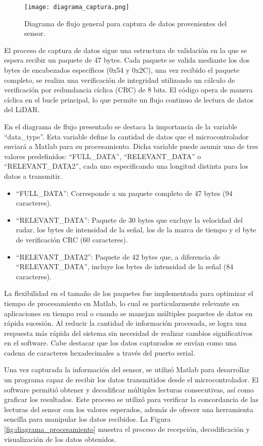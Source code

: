 \begin{figure}[H]
	\centering
	\texttt{[image: diagrama\_captura.png]}
	\caption{Diagrama de flujo general para captura de datos provenientes del sensor.}
	\label{fig:diagrama_captura}
\end{figure}

El proceso de captura de datos sigue una estructura de validación en la que se espera recibir un paquete de 47 bytes. Cada paquete se valida mediante los dos bytes de encabezados específicos (0x54 y 0x2C), una vez recibido el paquete completo, se realiza una verificación de integridad utilizando un cálculo de verificación por redundancia cíclica (CRC) de 8 bits. El código opera de manera cíclica en el bucle principal, lo que permite un flujo continuo de lectura de datos del LiDAR. 

En el diagrama de flujo presentado se destaca la importancia de la variable ``data\_type''. Esta variable define la cantidad de datos que el microcontrolador enviará a Matlab para su procesamiento. Dicha variable puede asumir uno de tres valores predefinidos: ``FULL\_DATA'', ``RELEVANT\_DATA'' o ``RELEVANT\_DATA2'', cada uno especificando una longitud distinta para los datos a transmitir.
\begin{itemize}
	\item  ``FULL\_DATA'': Corresponde a un paquete completo de 47 bytes (94 caracteres).
	\item ``RELEVANT\_DATA'': Paquete de 30 bytes que excluye la velocidad del radar, los bytes de intensidad de la señal, los de la marca de tiempo y el byte de verificación CRC (60 caracteres).
	\item ``RELEVANT\_DATA2'': Paquete de 42 bytes que, a diferencia de ``RELEVANT\_DATA'', incluye los bytes de intensidad de la señal (84 caracteres).
\end{itemize}
La flexibilidad en el tamaño de los paquetes fue implementada para optimizar el tiempo de procesamiento en Matlab, lo cual es particularmente relevante en aplicaciones en tiempo real o cuando se manejan múltiples paquetes de datos en rápida sucesión. Al reducir la cantidad de información procesada, se logra una respuesta más rápida del sistema sin necesidad de realizar cambios significativos en el software. Cabe destacar que los datos capturados se envían como una cadena de caracteres hexadecimales a través del puerto serial.

Una vez capturada la información del sensor, se utilizó Matlab para desarrollar un programa capaz de recibir los datos transmitidos desde el microcontrolador. El software permitió obtener y decodificar múltiples lecturas consecutivas, así como graficar los resultados. Este proceso se utilizó para verificar la concordancia de las lecturas del sensor con los valores esperados, además de ofrecer una herramienta sencilla para manipular los datos recibidos. La Figura \ref{fig:diagrama_procesamiento} muestra el proceso de recepción, decodificación y visualización de los datos obtenidos.

